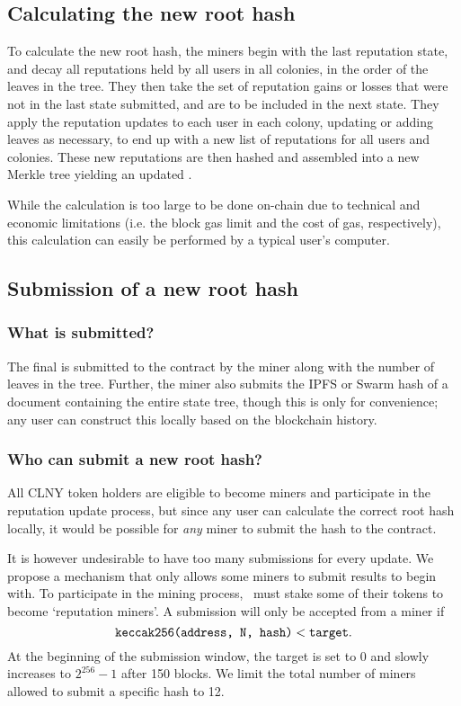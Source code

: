 \subsection{Calculating the new root hash}
To calculate the new root hash, the miners begin with the last reputation state, and decay all reputations held by all users in all colonies, in the order of the leaves in the tree. They then take the set of reputation gains or losses that were not in the last state submitted, and are to be included in the next state. They apply the reputation updates to each user in each colony, updating or adding leaves as necessary, to end up with a new list of reputations for all users and colonies. These new reputations are then hashed and assembled into a new Merkle tree yielding an updated .

While the calculation is too large to be done on-chain due to technical and economic limitations (i.e. the block gas limit and the cost of gas, respectively), this calculation can easily be performed by a typical user's computer.

\subsection{Submission of a new root hash}
%
\subsubsection*{What is submitted?}
The final  is submitted to the contract by the miner along with the number of leaves in the tree. Further, the miner also submits the IPFS or Swarm hash of a document containing the entire state tree, though this is only for convenience; any user can construct this locally based on the blockchain history.
%
\subsubsection*{Who can submit a new root hash?}
All CLNY token holders are eligible to become miners and participate in the reputation update process, but since any user can calculate the correct root hash locally, it would be possible for \emph{any} miner to submit the hash to the contract.

It is however undesirable to have too many submissions for every update. We propose a mechanism that only allows some miners to submit results to begin with. To participate in the mining process, \rcths\ must stake some of their tokens to become `reputation miners'. A submission will only be accepted from a miner if 
\begin{equation*}\label{eq:mining-difficulty}
\texttt{keccak256(address, N, hash)} < \texttt{target}. 
\end{equation*}
At the beginning of the submission window, the target is set to 0 and slowly increases to $2^{256}-1$ after 150 blocks. We limit the total number of miners allowed to submit a specific hash to 12.

